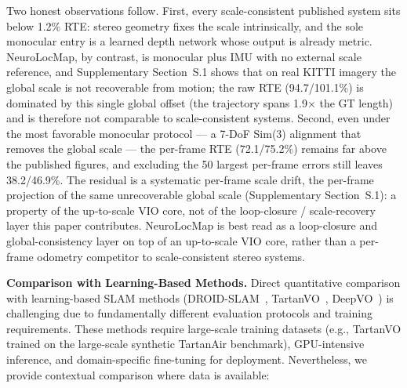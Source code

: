 Two honest observations follow. First, every scale-consistent published system sits below 1.2\% RTE: stereo geometry fixes the scale intrinsically, and the sole monocular entry is a learned depth network whose output is already metric. NeuroLocMap, by contrast, is monocular plus IMU with no external scale reference, and Supplementary Section~S.1 shows that on real KITTI imagery the global scale is not recoverable from motion; the raw RTE (94.7/101.1\%) is dominated by this single global offset (the trajectory spans 1.9$\times$ the GT length) and is therefore not comparable to scale-consistent systems. Second, even under the most favorable monocular protocol --- a 7-DoF Sim(3) alignment that removes the global scale --- the per-frame RTE (72.1/75.2\%) remains far above the published figures, and excluding the 50 largest per-frame errors still leaves 38.2/46.9\%. The residual is a systematic per-frame scale drift, the per-frame projection of the same unrecoverable global scale (Supplementary Section~S.1): a property of the up-to-scale VIO core, not of the loop-closure / scale-recovery layer this paper contributes. NeuroLocMap is best read as a loop-closure and global-consistency layer on top of an up-to-scale VIO core, rather than a per-frame odometry competitor to scale-consistent stereo systems.

\textbf{Comparison with Learning-Based Methods.} Direct quantitative comparison with learning-based SLAM methods (DROID-SLAM~\cite{teed2021droid}, TartanVO~\cite{wang2021tartanvo}, DeepVO~\cite{wang2017deepvo}) is challenging due to fundamentally different evaluation protocols and training requirements. These methods require large-scale training datasets (e.g., TartanVO trained on the large-scale synthetic TartanAir benchmark), GPU-intensive inference, and do\-main-spe\-cif\-ic fine-tuning for deployment. Nevertheless, we provide contextual comparison where data is available:

